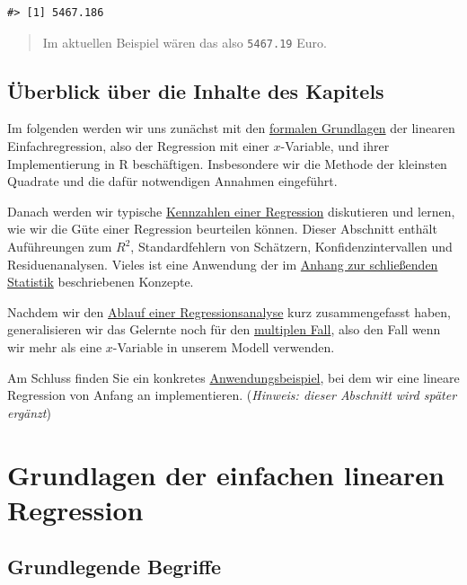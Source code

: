 \documentclass[]{book}
\begin{document}
\begin{verbatim}
#> [1] 5467.186
\end{verbatim}

\begin{quote}
Im aktuellen Beispiel wären das also \texttt{5467.19} Euro.
\end{quote}

\subsection{Überblick über die Inhalte des
Kapitels}\label{uberblick-uber-die-inhalte-des-kapitels}

Im folgenden werden wir uns zunächst mit den
\protect\hyperlink{lin-grundlagen}{formalen Grundlagen} der linearen
Einfachregression, also der Regression mit einer \(x\)-Variable, und
ihrer Implementierung in R beschäftigen. Insbesondere wir die Methode
der kleinsten Quadrate und die dafür notwendigen Annahmen eingeführt.

Danach werden wir typische \protect\hyperlink{lin-kennzahlen}{Kennzahlen
einer Regression} diskutieren und lernen, wie wir die Güte einer
Regression beurteilen können. Dieser Abschnitt enthält Auführeungen zum
\(R^2\), Standardfehlern von Schätzern, Konfidenzintervallen und
Residuenanalysen. Vieles ist eine Anwendung der im
\protect\hyperlink{stat-rep}{Anhang zur schließenden Statistik}
beschriebenen Konzepte.

Nachdem wir den \protect\hyperlink{stat-ablauf}{Ablauf einer
Regressionsanalyse} kurz zusammengefasst haben, generalisieren wir das
Gelernte noch für den \protect\hyperlink{lin-multi}{multiplen Fall},
also den Fall wenn wir mehr als eine \(x\)-Variable in unserem Modell
verwenden.

Am Schluss finden Sie ein konkretes
\protect\hyperlink{lin-beispiel}{Anwendungsbeispiel}, bei dem wir eine
lineare Regression von Anfang an implementieren. (\emph{Hinweis: dieser
Abschnitt wird später ergänzt})

\hypertarget{lin-grundlagen}{\section{Grundlagen der einfachen linearen
Regression}\label{lin-grundlagen}}

\subsection{Grundlegende Begriffe}\label{grundlegende-begriffe}
\end{document}
